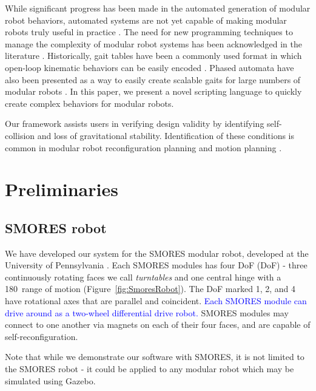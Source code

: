\documentclass[conference]{IEEEtran}
\theoremstyle{definition}
\newcommand{\changedByJim}[1]{\textcolor{blue}{#1}}
\begin{document}
While significant progress has been made in the automated generation of modular robot behaviors,
automated systems are not yet capable of making modular robots truly useful in practice
\cite{yim2007modular}.  The need for new programming techniques to manage the complexity
of modular robot systems has been acknowledged in the literature \cite{yim2000modular}.
Historically, gait tables have been a commonly used format in which open-loop kinematic
behaviors can be easily encoded \cite{yim1994locomotion}. Phased automata have also
been presented as a way to easily create scalable gaits for large numbers of modular
robots \cite{zhang2003phase}. In this paper, we present a novel scripting language
to quickly create complex behaviors for modular robots.

Our framework assists users in verifying design validity by identifying self-collision
and loss of gravitational stability. Identification of these conditions is common
in modular robot reconfiguration planning \cite{casal2001reconfiguration} and motion
planning \cite{yoshida2002self}.

\section{Preliminaries}
\label{sec:preliminaries}
\subsection{SMORES robot}
We have developed our system for the SMORES modular robot, developed at the
University of Pennsylvania \cite{Davey2012}. Each SMORES modules has four DoF
(DoF) - three continuously rotating faces we call {\em turntables} and one
central hinge with a 180\textdegree\ range of motion (Figure~\ref{fig:SmoresRobot}). The
DoF marked 1, 2, and 4 have rotational axes that are parallel and coincident.
\changedByJim{Each SMORES module can drive around as a two-wheel differential
drive robot.}
SMORES modules may connect to one another via magnets on each of their four
faces, and are capable of  self-reconfiguration.

Note that while we demonstrate our software with SMORES, it is not limited to
the SMORES robot - it could be applied to any modular robot which may be
simulated using Gazebo.
\end{document}
